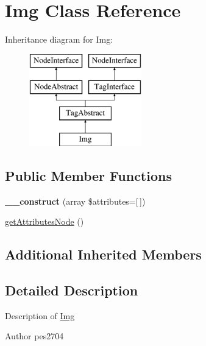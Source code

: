 \hypertarget{class_pes_1_1_dom_1_1_node_1_1_tag_1_1_img}{}\section{Img Class Reference}
\label{class_pes_1_1_dom_1_1_node_1_1_tag_1_1_img}
Inheritance diagram for Img\+:\begin{figure}[H]
\begin{center}
\leavevmode
\includegraphics[height=4.000000cm]{class_pes_1_1_dom_1_1_node_1_1_tag_1_1_img}
\end{center}
\end{figure}
\subsection*{Public Member Functions}
\begin{DoxyCompactItemize}
\item 
\mbox{\label{class_pes_1_1_dom_1_1_node_1_1_tag_1_1_img_afe55bc1439758d475e70446a774807d9}} 
{\bfseries \+\_\+\+\_\+construct} (array \$attributes=\mbox{[}$\,$\mbox{]})
\item 
\mbox{\hyperlink{class_pes_1_1_dom_1_1_node_1_1_tag_1_1_img_a4722e7722b245351681b05d35f6694f3}{get\+Attributes\+Node}} ()
\end{DoxyCompactItemize}
\subsection*{Additional Inherited Members}


\subsection{Detailed Description}
Description of \mbox{\hyperlink{class_pes_1_1_dom_1_1_node_1_1_tag_1_1_img}{Img}}

\begin{DoxyAuthor}{Author}
pes2704 
\end{DoxyAuthor}


